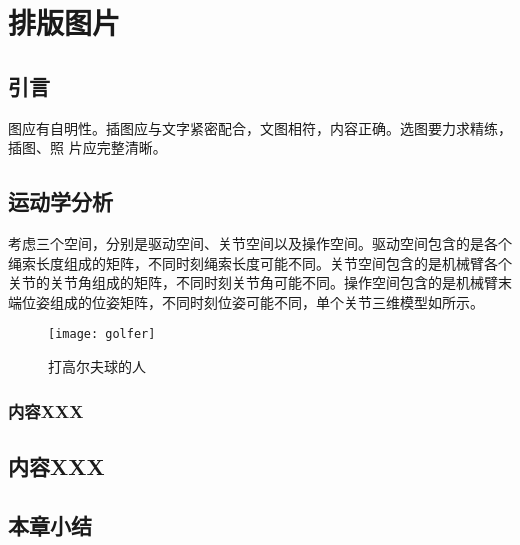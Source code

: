 
\chapter{排版图片}

\section{引言}
图应有自明性。插图应与文字紧密配合，文图相符，内容正确。选图要力求精练，插图、照
片应完整清晰。

\section{运动学分析}

考虑三个空间，分别是驱动空间、关节空间以及操作空间。驱动空间包含的是各个绳索长度组成的矩阵，不同时刻绳索长度可能不同。关节空间包含的是机械臂各个关节的关节角组成的矩阵，不同时刻关节角可能不同。操作空间包含的是机械臂末端位姿组成的位姿矩阵，不同时刻位姿可能不同，单个关节三维模型如所示。

\begin{figure}[ht]
\centering
\texttt{[image: golfer]}
\caption{打高尔夫球的人}
\label{fig:bm}
\end{figure}

\subsection{内容XXX}

\lipsum[3]

\section{内容XXX}

\lipsum[2]

\section{本章小结}

\lipsum[1]
